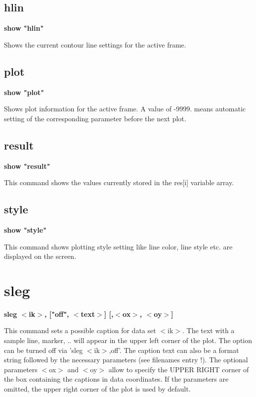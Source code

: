 \subsection*{hlin}
{\bf show "hlin" \par }
\par
\vspace{3pt}
Shows the current contour line settings for the active frame. 
\subsection*{plot}
{\bf show "plot" \par }
\par
\vspace{3pt}
Shows plot information for the active frame. A value of -9999. means 
automatic setting of the corresponding parameter before the next plot. 
\subsection*{result}
{\bf show "result" \par }
\par
\vspace{3pt}
This command shows the values currently stored in the res[i] 
variable array. 
\subsection*{style}
{\bf show "style" \par }
\par
\vspace{3pt}
This command shows plotting style setting like line color, line 
style etc. are displayed on the screen. 
\section{sleg}
{\bf sleg $ <$ik$> $, ["off", $ <$text$> $] [,$ <$ox$> $, $ <$oy$> $] \par }
\par
\vspace{3pt}
This command sets a possible caption for data set $ <$ik$> $. The text 
with a sample line, marker, .. will appear in the upper left corner 
of the plot. The option can be turned off via 'sleg $ <$ik$> $,off'. The 
caption text can also be a format string followed by the necessary 
parameters (see filenames entry !). The optional parameters $ <$ox$> $ 
and $ <$oy$> $ allow to specify the UPPER RIGHT corner of the box containing 
the captions in data coordinates. If the parameters are omitted, 
the upper right corner of the plot is used by default. 

